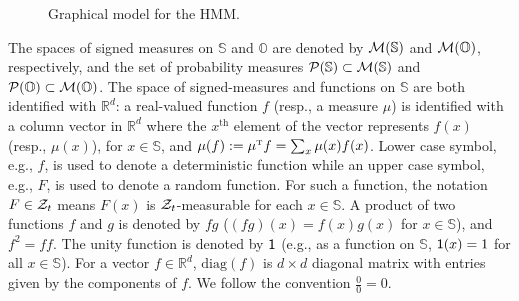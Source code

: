 \documentclass[twoside,11pt]{article}
\def\Re{\mathbb{R}}
\newcommand{\field}[1]{\mathbb{#1}}
\def\Re{\field{R}}
\def\clP{{\cal P}}
\def\clZ{{\cal Z}}
\def\clZ{{\cal Z}}
\def\bS{\begin{slide}}
\newcommand{\newP}[1]{\medskip\noindent{\bf #1:}}
\def\Re{\mathbb{R}}
\def\clP{{\cal P}}
\def\clZ{{\cal Z}}
\renewcommand{\Re}{\mathbb{R}}
\def\clM{{\cal M}}
\def\clP{{\cal P}}
\def\clZ{{\cal Z}}
\def\bS{\mathbb{S}}
\def\bO{\mathbb{O}}
\def\ones{{\sf 1}}
\def\tp{{\hbox{\rm\tiny T}}}
\begin{document}
\begin{figure}
\begin{center}

  \end{center}
  \vspace{-4em}
  \caption{Graphical model for the HMM.
  }
  \label{fig:hmm}
  \vspace*{-10pt}
\end{figure}

\newP{Notation}
The spaces of signed measures on $\bS$ and $\bO$ are denoted by $\clM(\bS)$ and $\clM(\bO)$, respectively, and the set of probability measures $\clP(\bS)\subset \clM(\bS)$ and $\clP(\bO) \subset \clM(\bO)$.  
The space of signed-measures and functions on $\bS$ are both identified with $\Re^d$: a real-valued function $f$ (resp., a measure $\mu$) is identified with a column vector in $\Re^d$ where the $x^{\text{th}}$ element of the vector represents $f(x)$ (resp., $\mu(x)$), for $x\in\bS$, and $\mu(f) := \mu^\tp f = \sum_{x} \mu(x) f(x)$.   
Lower case symbol, e.g., $f$, is used to denote a deterministic function while an upper case symbol, e.g., $F$, is used to denote a random function. 
For such a function, the notation $F\in\clZ_t$ means $F(x)$ is $\clZ_t$-measurable for each $x\in \bS$. 
A product of two functions $f$ and $g$ is denoted by $fg$ ($(fg)(x)=f(x)g(x)$ for $x\in\bS$), and $f^2=ff$.
The unity function is denoted by $\ones$ (e.g., as a function on $\bS$, $\ones (x)=1$ for all $x\in\bS$).
For a vector $f\in\Re^d$, $\text{diag}(f)$ is $d\times d$ diagonal matrix with entries given by the components of $f$.
We follow the convention $\frac{0}{0}=0$. 
\end{document}
